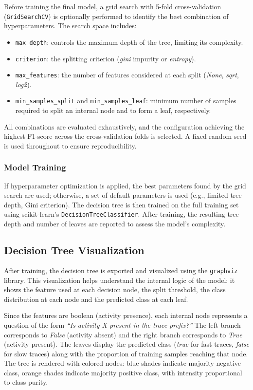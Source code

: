 \documentclass{article}
\begin{document}
Before training the final model, a grid search with 5-fold cross-validation (\texttt{GridSearchCV}) is optionally performed to identify the best combination of hyperparameters. The search space includes:

\begin{itemize}
    \item \texttt{max\_depth}: controls the maximum depth of the tree, limiting its complexity.
    \item \texttt{criterion}: the splitting criterion (\textit{gini} impurity or \textit{entropy}).
    \item \texttt{max\_features}: the number of features considered at each split (\textit{None}, \textit{sqrt}, \textit{log2}).
    \item \texttt{min\_samples\_split} and \texttt{min\_samples\_leaf}: minimum number of samples required to split an internal node and to form a leaf, respectively.
\end{itemize}

\noindent
All combinations are evaluated exhaustively, and the configuration achieving the highest F1-score across the cross-validation folds is selected. A fixed random seed is used throughout to ensure reproducibility.

\subsubsection{Model Training}

If hyperparameter optimization is applied, the best parameters found by the grid search are used; otherwise, a set of default parameters is used (e.g., limited tree depth, Gini criterion). The decision tree is then trained on the full training set using scikit-learn's \texttt{DecisionTreeClassifier}. After training, the resulting tree depth and number of leaves are reported to assess the model's complexity.

\subsection{Decision Tree Visualization}

After training, the decision tree is exported and visualized using the \texttt{graphviz} library. This visualization helps understand the internal logic of the model: it shows the feature used at each decision node, the split threshold, the class distribution at each node and the predicted class at each leaf.

\medskip
\noindent
Since the features are boolean (activity presence), each internal node represents a question of the form \textit{``Is activity X present in the trace prefix?''} The left branch corresponds to \textit{False} (activity absent) and the right branch corresponds to \textit{True} (activity present). The leaves display the predicted class (\textit{true} for fast traces, \textit{false} for slow traces) along with the proportion of training samples reaching that node. The tree is rendered with colored nodes: blue shades indicate majority negative class, orange shades indicate majority positive class, with intensity proportional to class purity.
\end{document}
